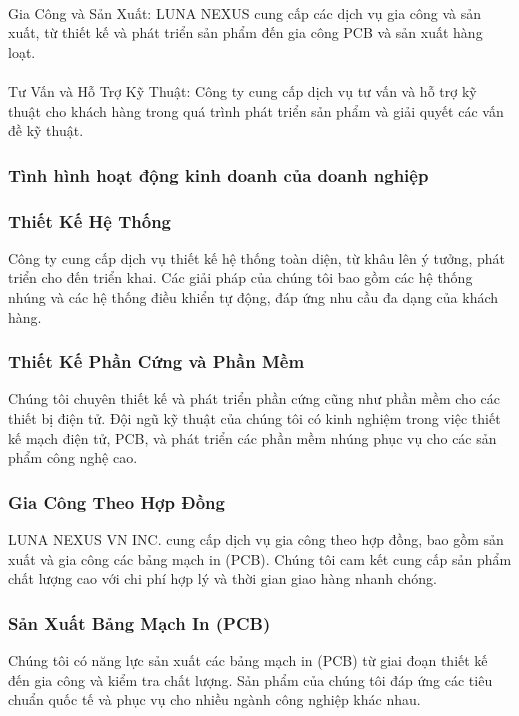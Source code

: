 \begin{flushleft}
		\paragraph{}
		Gia Công và Sản Xuất: LUNA NEXUS cung cấp các dịch vụ gia công và sản xuất, từ thiết kế và phát triển sản phẩm đến gia công PCB và sản xuất hàng loạt.\\
		\paragraph{}
		Tư Vấn và Hỗ Trợ Kỹ Thuật: Công ty cung cấp dịch vụ tư vấn và hỗ trợ kỹ thuật cho khách hàng trong quá trình phát triển sản phẩm và giải quyết các vấn đề kỹ thuật.\\
		\subsubsection{Tình hình hoạt động kinh doanh của doanh nghiệp}
		\subsubsection*{ Thiết Kế Hệ Thống}
		Công ty cung cấp dịch vụ thiết kế hệ thống toàn diện, từ khâu lên ý tưởng, phát triển cho đến triển khai. Các giải pháp của chúng tôi bao gồm các hệ thống nhúng và các hệ thống điều khiển tự động, đáp ứng nhu cầu đa dạng của khách hàng.

		\subsubsection*{ Thiết Kế Phần Cứng và Phần Mềm}
		Chúng tôi chuyên thiết kế và phát triển phần cứng cũng như phần mềm cho các thiết bị điện tử. Đội ngũ kỹ thuật của chúng tôi có kinh nghiệm trong việc thiết kế mạch điện tử, PCB, và phát triển các phần mềm nhúng phục vụ cho các sản phẩm công nghệ cao.

		\subsubsection*{ Gia Công Theo Hợp Đồng}
		LUNA NEXUS VN INC. cung cấp dịch vụ gia công theo hợp đồng, bao gồm sản xuất và gia công các bảng mạch in (PCB). Chúng tôi cam kết cung cấp sản phẩm chất lượng cao với chi phí hợp lý và thời gian giao hàng nhanh chóng.

		\subsubsection*{ Sản Xuất Bảng Mạch In (PCB)}
		Chúng tôi có năng lực sản xuất các bảng mạch in (PCB) từ giai đoạn thiết kế đến gia công và kiểm tra chất lượng. Sản phẩm của chúng tôi đáp ứng các tiêu chuẩn quốc tế và phục vụ cho nhiều ngành công nghiệp khác nhau.


\end{flushleft}
